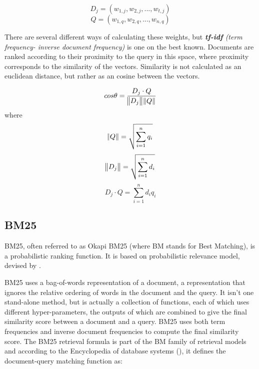 \begin{equation}
D_j = (w_{1,j}, w_{2,j},...,w_{t,j})
\end{equation}
\begin{equation}
Q = (w_{1,q}, w_{2,q},...,w_{n,q}) 
\end{equation}

There are several different ways of calculating these weights, but \textit{\textbf{tf-idf} (term frequency- inverse document frequency)} is one on the best known. Documents are ranked according to their proximity to the query in this space, where proximity corresponds to the similarity of the vectors. Similarity is not calculated as an euclidean distance, but rather as an cosine between the vectors.

\begin{equation}
cos\theta = \frac{D_j \cdot Q}{\norm{D_j} \norm{Q}}  
\end{equation} 
where
\begin{equation}
\norm{Q} = \sqrt{\sum\limits_{i=1}^n q_i }
\end{equation}
\begin{equation}
\norm{D_j} = \sqrt{\sum\limits_{i=1}^n d_i }
\end{equation}
\begin{equation}
D_j \cdot Q = \sum\limits_{i=1}^n d_i q_i
\end{equation}



\subsection{BM25}

BM25, often referred to as Okapi BM25 (where BM stands for Best Matching), is a probabilistic ranking function. It is based on probabilistic relevance model, devised by \citep{robertson1996okapi}. 

BM25 uses a bag-of-words representation of a document, a representation that ignores the relative ordering of words in the document and the query. It isn't one stand-alone method, but is actually a collection of functions, each of which uses different hyper-parameters, the outputs of which are combined to give the final similarity score between a document and a query. BM25 uses both term frequencies and inverse document frequencies to compute the final similarity score. The BM25 retrieval formula is part of the BM family of retrieval models and according to the Encyclopedia of database systems (\citep{amati2009bm25}), it defines the document-query matching function as:

